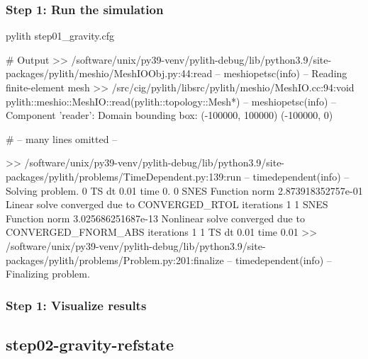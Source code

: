 \documentclass[aspectratio=169]{beamer}
\begin{document}
\begin{frame}[fragile]
  \frametitle{Step 1: Run the simulation}
  \summary{}

\begin{bashcode}
pylith step01_gravity.cfg

# Output
 >> /software/unix/py39-venv/pylith-debug/lib/python3.9/site-packages/pylith/meshio/MeshIOObj.py:44:read
 -- meshiopetsc(info)
 -- Reading finite-element mesh
 >> /src/cig/pylith/libsrc/pylith/meshio/MeshIO.cc:94:void pylith::meshio::MeshIO::read(pylith::topology::Mesh*)
 -- meshiopetsc(info)
 -- Component 'reader': Domain bounding box:
    (-100000, 100000)
    (-100000, 0)

# -- many lines omitted --

 >> /software/unix/py39-venv/pylith-debug/lib/python3.9/site-packages/pylith/problems/TimeDependent.py:139:run
 -- timedependent(info)
 -- Solving problem.
0 TS dt 0.01 time 0.
    0 SNES Function norm 2.873918352757e-01
    Linear solve converged due to CONVERGED_RTOL iterations 1
    1 SNES Function norm 3.025686251687e-13
  Nonlinear solve converged due to CONVERGED_FNORM_ABS iterations 1
1 TS dt 0.01 time 0.01
 >> /software/unix/py39-venv/pylith-debug/lib/python3.9/site-packages/pylith/problems/Problem.py:201:finalize
 -- timedependent(info)
 -- Finalizing problem.
\end{bashcode}
  
\end{frame}


\begin{frame}
  \frametitle{Step 1: Visualize results}

    
\end{frame}


\subsection{step02-gravity-refstate}
\end{document}
